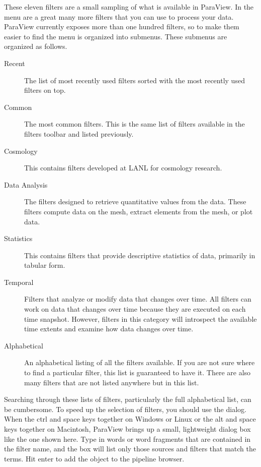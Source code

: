 These eleven filters are a small sampling of what is available in ParaView.
In the  menu are a great many more filters that you can use to
process your data.  ParaView currently exposes more than one hundred filters, so to
make them easier to find the  menu is organized into submenus.
These submenus are organized as follows.

\begin{description}
\item[Recent] The list of most recently used filters sorted with the most
  recently used filters on top.
\item[Common] The most common filters.  This is the same list of filters
  available in the filters toolbar and listed previously.
\item[Cosmology] This contains filters developed at LANL for cosmology research. 
\item[Data Analysis] The filters designed to retrieve quantitative values
  from the data.  These filters compute data on the mesh, extract elements
  from the mesh, or plot data.
\item[Statistics] This contains filters that provide descriptive
  statistics of data, primarily in tabular form.
\item[Temporal] Filters that analyze or modify data that changes over time.
  All filters can work on data that changes over time because they are
  executed on each time snapshot.  However, filters in this category will
  introspect the available time extents and examine how data changes over
  time.
\item[Alphabetical] An alphabetical listing of all the filters available.
  If you are not sure where to find a particular filter, this list is
  guaranteed to have it.  There are also many filters that are not listed
  anywhere but in this list.
\end{description}




Searching through these lists of filters, particularly the full
alphabetical list, can be cumbersome.  To speed up the selection of
filters, you should use the  dialog.  When the ctrl
and space keys together on Windows or Linux or the alt and space keys
together on Macintosh, ParaView brings up a small, lightweight dialog box
like the one shown here.  Type in words or word fragments that are
contained in the filter name, and the box will list only those sources and
filters that match the terms.  Hit enter to add the object to the pipeline
browser.

